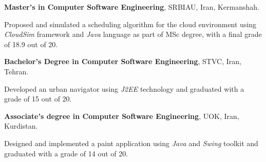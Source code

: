
\begin{scholarship}
{\textbf{Master's in Computer Software Engineering}, SRBIAU, Iran, Kermanshah.

Proposed and simulated a scheduling algorithm for the cloud environment using \textit{CloudSim} framework and \textit{Java} language as part of MSc degree, with a final grade of 18.9 out of 20. \vspace{5 pt}
}
				{\textbf{Bachelor's Degree in Computer Software Engineering}, STVC, Iran, Tehran.
 
 Developed an urban navigator using \textit{J2EE} technology and graduated with a grade of 15 out of 20. \vspace{5 pt}	
 }		
				{\textbf{Associate's degree in Computer Software Engineering}, UOK, Iran, Kurdistan.
 
 Designed and implemented a paint application using \textit{Java} and \textit{Swing} toolkit and graduated with a grade of 14 out of 20.
 }
\end{scholarship}
